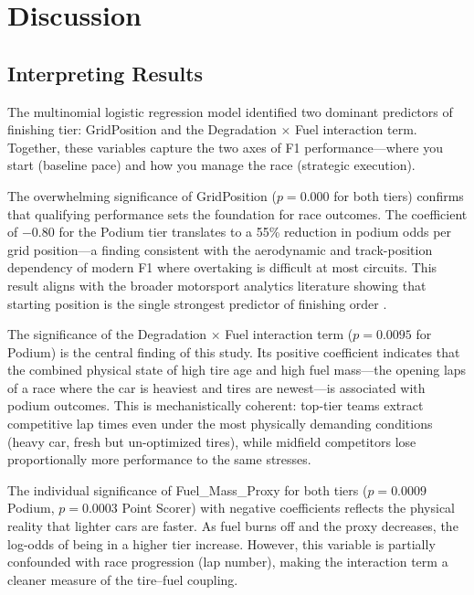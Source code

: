 \section{Discussion}

\subsection{Interpreting Results}

The multinomial logistic regression model identified two dominant predictors
of finishing tier: GridPosition and the Degradation $\times$ Fuel interaction
term. Together, these variables capture the two axes of F1 performance---where
you start (baseline pace) and how you manage the race (strategic execution).

The overwhelming significance of GridPosition ($p = 0.000$ for both tiers)
confirms that qualifying performance sets the foundation for race outcomes.
The coefficient of $-0.80$ for the Podium tier translates to a 55\% reduction
in podium odds per grid position---a finding consistent with the aerodynamic
and track-position dependency of modern F1 where overtaking is difficult at
most circuits. This result aligns with the broader motorsport analytics
literature showing that starting position is the single strongest predictor
of finishing order \parencite{kuhn2022f1}.

The significance of the Degradation $\times$ Fuel interaction term
($p = 0.0095$ for Podium) is the central finding of this study. Its positive
coefficient indicates that the combined physical state of high tire age and
high fuel mass---the opening laps of a race where the car is heaviest and
tires are newest---is associated with podium outcomes. This is
mechanistically coherent: top-tier teams extract competitive lap times even
under the most physically demanding conditions (heavy car, fresh but
un-optimized tires), while midfield competitors lose proportionally more
performance to the same stresses.

The individual significance of Fuel\_Mass\_Proxy for both tiers
($p = 0.0009$ Podium, $p = 0.0003$ Point Scorer) with negative coefficients
reflects the physical reality that lighter cars are faster. As fuel burns off
and the proxy decreases, the log-odds of being in a higher tier increase.
However, this variable is partially confounded with race progression (lap
number), making the interaction term a cleaner measure of the tire--fuel
coupling.

